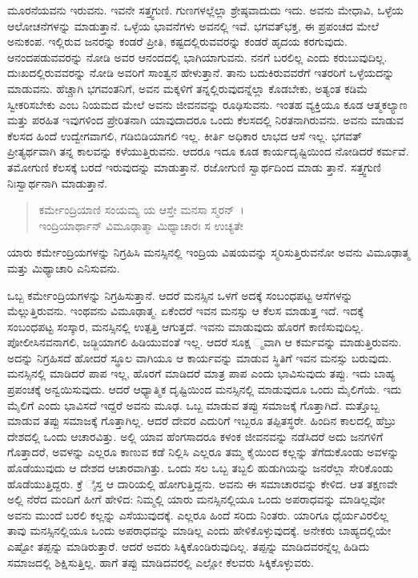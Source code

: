 ಮೂರನೆಯವನು ಇರುವನು. ಇವನೇ ಸತ್ತ್ವಗುಣಿ. ಗುಣಗಳಲ್ಲೆಲ್ಲಾ ಶ್ರೇಷ್ಠವಾದುದು ಇದು. ಅವನು ಮೇಧಾವಿ, ಒಳ್ಳೆಯ ಆಲೋಚನೆಗಳನ್ನು ಮಾಡುತ್ತಾನೆ. ಒಳ್ಳೆಯ ಭಾವನೆಗಳು ಅವನಲ್ಲಿ ಇವೆ. ಭಗವತ್​ಭಕ್ತ, ಈ ಪ್ರಪಂಚದ ಮೇಲೆ ಅನುಕಂಪ. ಇಲ್ಲಿರುವ ಜನರನ್ನು ಕಂಡರೆ ಪ್ರೀತಿ, ಕಷ್ಟದಲ್ಲಿರುವವರನ್ನು ಕಂಡರೆ ಹೃದಯ ಕರಗುವುದು. ಆನಂದಪಡುವವರನ್ನು ನೋಡಿ ಅವರ ಆನಂದದಲ್ಲಿ ಭಾಗಿಯಾಗುವನು. ನನಗೆ ಬರಲಿಲ್ಲ ಎಂದು ಕರುಬುವುದಿಲ್ಲ. ದುಃಖದಲ್ಲಿರುವವರನ್ನು ನೋಡಿ ಅವರಿಗೆ ಸಾಂತ್ವನ ಹೇಳುತ್ತಾನೆ. ತಾನು ಬದುಕಿರುವವರೆಗೆ ಇತರರಿಗೆ ಒಳ್ಳೆಯದನ್ನು ಮಾಡುವನು. ಹೆಚ್ಚಾಗಿ ಭಗವಂತನಿಗೆ, ಅವನ ಮಕ್ಕಳಿಗೆ ತನ್ನಲ್ಲಿರುವುದನ್ನೆಲ್ಲಾ ಕೊಡಬೇಕು, ಅತ್ಯಂತ ಕಡಿಮೆ ಸ್ವೀಕರಿಸಬೇಕು ಎಂಬ ನಿಯಮದ ಮೇಲೆ ಅವನು ಜೀವನವನ್ನು ರೂಢಿಸುವನು. ಇಂತಹ ವ್ಯಕ್ತಿಯೂ ಕೂಡ ಆತ್ಮಕಲ್ಯಾಣ ಮತ್ತು ಪರಹಿತ ಇವುಗಳಿಂದ ಪ್ರೇರಿತನಾಗಿ ಯಾವುದಾದರೂ ಒಂದು ಕೆಲಸದಲ್ಲಿ ನಿರತನಾಗಿರುವನು. ಅವನು ಮಾಡುವ ಕೆಲಸದ ಹಿಂದೆ ಉದ್ವೇಗವಾಗಲಿ, ಗಡಿಬಿಡಿಯಾಗಲಿ ಇಲ್ಲ. ಕೀರ್ತಿ ಅಧಿಕಾರ ಲಾಭದ ಆಸೆ ಇಲ್ಲ. ಭಗವತ್ ಪ್ರೀತ್ಯರ್ಥವಾಗಿ ತನ್ನ ಕಾಲವನ್ನು ಕಳೆಯುತ್ತಿರುವನು. ಆದರೂ ಇದೂ ಕೂಡ ಕಾರ್ಯದೃಷ್ಟಿಯಿಂದ ನೋಡಿದರೆ ಕರ್ಮವೆ. ತಮೋಗುಣಿ ಕೆಲಸಕ್ಕೆ ಬರದೆ ಇರುವುದನ್ನು ಮಾಡುತ್ತಾನೆ. ರಜೋಗುಣಿ ಸ್ವಾರ್ಥದಿಂದ ಮಾಡು ತ್ತಾನೆ. ಸತ್ತ್ವಗುಣಿ ನಿಃಸ್ವಾರ್ಥನಾಗಿ ಮಾಡುತ್ತಾನೆ.

\begin{verse}
ಕರ್ಮೇಂದ್ರಿಯಾಣಿ ಸಂಯಮ್ಯ ಯ ಆಸ್ತೇ ಮನಸಾ ಸ್ಮರನ್~।\\ಇಂದ್ರಿಯಾರ್ಥಾನ್ ವಿಮೂಢಾತ್ಮಾ ಮಿಥ್ಯಾಚಾರಃ ಸ ಉಚ್ಯತೇ 
\end{verse}

{\small ಯಾರು ಕರ್ಮೇಂದ್ರಿಯಗಳನ್ನು ನಿಗ್ರಹಿಸಿ ಮನಸ್ಸಿನಲ್ಲಿ ಇಂದ್ರಿಯ ವಿಷಯವನ್ನು ಸ್ಮರಿಸುತ್ತಿರುವನೋ ಅವನು ವಿಮೂಢಾತ್ಮ ಮತ್ತು ಮಿಥ್ಯಾಚಾರಿ ಎನಿಸುವನು.}

ಒಬ್ಬ ಕರ್ಮೇಂದ್ರಿಯಗಳನ್ನು ನಿಗ್ರಹಿಸುತ್ತಾನೆ. ಆದರೆ ಮನಸ್ಸಿನ ಒಳಗೆ ಅದಕ್ಕೆ ಸಂಬಂಧಪಟ್ಟ ಆಸೆಗಳನ್ನು ಮೆಲ್ಲುತ್ತಿರುವನು. ಇಂಥವನು ವಿಮೂಢಾತ್ಮ. ಏಕೆಂದರೆ ಇವನ ಮನಸ್ಸು ಆ ಕೆಲಸ ಮಾಡುತ್ತ ಇದೆ. ಇದಕ್ಕೆ ಸಂಬಂಧಪಟ್ಟ ಸಂಸ್ಕಾರ, ಮನಸ್ಸಿನಲ್ಲಿ ಉತ್ಪತ್ತಿ ಆಗುತ್ತದೆ. ಇವನು ಮಾಡುವುದು ಹೊರಗೆ ಕಾಣಿಸುವುದಿಲ್ಲ. ಪೋಲೀಸಿನವನಾಗಲಿ, ಜಡ್ಜಿಯಾಗಲಿ ಹಿಡಿಯುವಂತೆ ಇಲ್ಲ. ಆದರೆ ಸೂಕ್ಷ ್ಮವಾಗಿ ಆ ಕರ್ಮವನ್ನು ಮಾಡುತ್ತಿರುವನು. ಅದನ್ನು ನಿಗ್ರಹಿಸದೆ ಹೋದರೆ ಸ್ಥೂಲ ವಾಗಿಯೂ ಆ ಕಾರ್ಯವನ್ನು ಮಾಡುವ ಸ್ಥಿತಿಗೆ ಇವನ ಮನಸ್ಸು ಬರುವುದು. ಮನಸ್ಸಿನಲ್ಲಿ ಮಾಡಿದರೆ ಪಾಪ ಇಲ್ಲ, ಹೊರಗೆ ಮಾಡಿದರೆ ಮಾತ್ರ ಪಾಪ ಎಂದು ಭಾವಿಸುವುದು ತಪ್ಪು. ಇದು ಬಾಹ್ಯ ಪ್ರಪಂಚಕ್ಕೆ ಅನ್ವಯಿಸುವುದು. ಆದರೆ ಆಧ್ಯಾತ್ಮಿಕ ದೃಷ್ಟಿಯಿಂದ ಮನಸ್ಸಿನಲ್ಲಿ ಮಾಡುವುದೂ ಒಂದು ಮೈಲಿಗೆಯೆ. ಇದು ಮೈಲಿಗೆ ಎಂದು ಭಾವಿಸದೆ ಇದ್ದರೆ ಅವನು ಮೂಢ. ಒಬ್ಬ ಮಾಡುವ ತಪ್ಪು ಸಮಾಜಕ್ಕೆ ಗೊತ್ತಾಗಿದೆ. ಮತ್ತೊಬ್ಬ ಮಾಡುವ ತಪ್ಪು ಸಮಾಜಕ್ಕೆ ಗೊತ್ತಾಗಿಲ್ಲ. ಆದರೆ ದೇವರ ಎದುರಿಗೆ ಇಬ್ಬರೂ ತಪ್ಪಿತಸ್ಥರೇ. ಹಿಂದಿನ ಕಾಲದಲ್ಲಿ ಹೆಬ್ರು ದೇಶದಲ್ಲಿ ಒಂದು ಆಚಾರವಿತ್ತು. ಅಲ್ಲಿ ಯಾವ ಹೆಂಗಸಾದರೂ ಕಳಂಕ ಜೀವನವನ್ನು ನಡೆಸಿದರೆ ಅದು ಜನಗಳಿಗೆ ಗೊತ್ತಾದರೆ, ಅವಳನ್ನು ಎಲ್ಲರೂ ಕಾಣುವ ಕಡೆ ನಿಲ್ಲಿಸಿ ಎಲ್ಲರೂ ತಮ್ಮ ಕೈಯಿಂದ ಕಲ್ಲನ್ನು ತೆಗೆದುಕೊಂಡು ಅವಳನ್ನು ಹೊಡೆಯುವುದು ಆ ದೇಶದ ಆಚಾರವಾಗಿತ್ತು. ಒಂದು ಸಲ ಒಬ್ಬ ತಬ್ಬಲಿ ಹುಡುಗಿಯನ್ನು ಜನರೆಲ್ಲಾ ಸೇರಿಕೊಂಡು ಹೊಡೆಯುತ್ತಿದ್ದರು. ಕ್ರೆ ೈಸ್ತ ಆ ದಾರಿಯಲ್ಲಿ ಹೋಗುತ್ತಿದ್ದನು. ಅವನು ಈ ಸಮಾಚಾರವನ್ನು ಕೇಳಿದ. ಆತ ತಕ್ಷಣವೇ ಅಲ್ಲಿ ನೆರೆದ ಮಂದಿಗೆ ಹೀಗೆ ಹೇಳಿದ: ನಿಮ್ಮಲ್ಲಿ ಯಾರು ಮನಸ್ಸಿನಲ್ಲಿಯೂ ಒಂದು ಅಪರಾಧವನ್ನು ಮಾಡಿಲ್ಲವೋ ಅವನು ಮುಂದೆ ಬರಲಿ ಕಲ್ಲನ್ನು ಎಸೆಯುವುದಕ್ಕೆ. ಎಲ್ಲರೂ ಹಿಂದೆ ಸರಿದು ನಿಂತರು. ಯಾರಿಗೂ ಧೈರ್ಯವಿರಲಿಲ್ಲ ತಾವು ಮನಸ್ಸಿನಲ್ಲಿಯೂ ಒಂದು ಅಪರಾಧವನ್ನು ಮಾಡಿಲ್ಲ ಎಂದು ಹೇಳಿಕೊಳ್ಳುವುದಕ್ಕೆ. ಅನೇಕರು ಬಾಹ್ಯದಲ್ಲಿಯೇ ಎಷ್ಟೋ ತಪ್ಪನ್ನು ಮಾಡಿರುತ್ತಾರೆ. ಆದರೆ ಅವರು ಸಿಕ್ಕಿಕೊಂಡಿರುವುದಿಲ್ಲ. ತಪ್ಪನ್ನು ಮಾಡಿದವರನ್ನೆಲ್ಲ ಹಿಡಿದು ಸಮಾಜದಲ್ಲಿ ಶಿಕ್ಷಿಸುತ್ತಿಲ್ಲ. ಹಾಗೆ ತಪ್ಪು ಮಾಡಿದವರಲ್ಲಿ ಎಲ್ಲೋ ಕೆಲವರು ಸಿಕ್ಕಿಕೊಳ್ಳುವರು.

